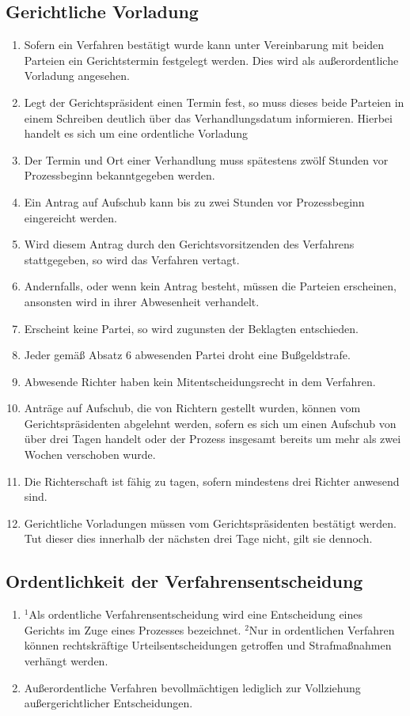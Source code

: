 \documentclass{article}
\begin{document}
\subsection{Gerichtliche Vorladung}
\begin{enumerate}[(1)]
    \item Sofern ein Verfahren bestätigt wurde kann unter Vereinbarung mit beiden Parteien ein Gerichtstermin festgelegt werden. Dies wird als außerordentliche Vorladung angesehen.
    \item Legt der Gerichtspräsident einen Termin fest, so muss dieses beide Parteien in einem Schreiben deutlich über das Verhandlungsdatum informieren. Hierbei handelt es sich um eine ordentliche Vorladung
    \item Der Termin und Ort einer Verhandlung muss spätestens zwölf Stunden vor Prozessbeginn bekanntgegeben werden.
    \item Ein Antrag auf Aufschub kann bis zu zwei Stunden vor Prozessbeginn eingereicht werden.
    \item Wird diesem Antrag durch den Gerichtsvorsitzenden des Verfahrens stattgegeben, so wird das Verfahren vertagt.
    \item Andernfalls, oder wenn kein Antrag besteht, müssen die Parteien erscheinen, ansonsten wird in ihrer Abwesenheit verhandelt.
    \item Erscheint keine Partei, so wird zugunsten der Beklagten entschieden.
    \item Jeder gemäß Absatz 6 abwesenden Partei droht eine Bußgeldstrafe.
    \item Abwesende Richter haben kein Mitentscheidungsrecht in dem Verfahren.
    \item Anträge auf Aufschub, die von Richtern gestellt wurden, können vom Gerichtspräsidenten abgelehnt werden, sofern es sich um einen Aufschub von über drei Tagen handelt oder der Prozess insgesamt bereits um mehr als zwei Wochen verschoben wurde.
    \item Die Richterschaft ist fähig zu tagen, sofern mindestens drei Richter anwesend sind.
    \item Gerichtliche Vorladungen müssen vom Gerichtspräsidenten bestätigt werden. Tut dieser dies innerhalb der nächsten drei Tage nicht, gilt sie dennoch.
\end{enumerate}

\subsection{Ordentlichkeit der Verfahrensentscheidung}
\begin{enumerate}[(1)]
    \item ${^1}$Als ordentliche Verfahrensentscheidung wird eine Entscheidung eines Gerichts im Zuge eines Prozesses bezeichnet. ${^2}$Nur in ordentlichen Verfahren können rechtskräftige Urteilsentscheidungen getroffen und Strafmaßnahmen verhängt werden.
    \item Außerordentliche Verfahren bevollmächtigen lediglich zur Vollziehung außergerichtlicher Entscheidungen.
\end{enumerate}
\end{document}
